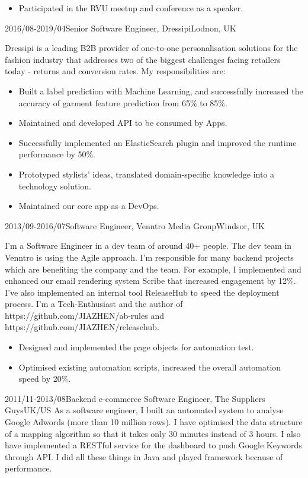 \documentclass[a4paper]{twentysecondcv-english} %
\begin{document}
\begin{twenty}
{\begin{itemize}
                \item Participated in the RVU meetup and conference as a speaker.
                \end{itemize}}
	\twentyitem
	    {2016/08-2019/04}{Senior Software Engineer, Dressipi}{Lodnon, UK}
    	{Dressipi is a leading B2B provider of one-to-one personalisation solutions for the fashion industry that addresses two of the biggest challenges facing retailers today - returns and conversion rates. My responsibilities are:
        	\begin{itemize}
                \item Built a label prediction with Machine Learning, and successfully increased the accuracy of garment feature prediction from 65\% to 85\%.
                \item Maintained and developed API to be consumed by Apps.
                \item Successfully implemented an ElasticSearch plugin and improved the runtime performance by 50\%.
                \item Prototyped stylists' ideas, translated domain-specific knowledge into a technology solution.
                \item Maintained our core app as a DevOps.
            \end{itemize}}
\end{twenty}

\newpage %
\makesidebar

\begin{twenty}
    \twentyitem
	    {2013/09-2016/07}{Software Engineer, Venntro Media Group}{Windsor, UK}
    	{I'm a Software Engineer in a dev team of around 40+ people. The dev team in Venntro is using the Agile approach. I'm responsible for many backend projects which are benefiting the company and the team. For example, I implemented and enhanced our email rendering system Scribe that increased engagement by 12\%. I've also implemented an internal tool ReleaseHub to speed the deployment process. I'm a Tech-Enthusiast and the author of https://github.com/JIAZHEN/ab-rules and https://github.com/JIAZHEN/releasehub.
        	\begin{itemize}
                \item Designed and implemented the page objects for automation test.
                \item Optimised existing automation scripts, increased the overall automation speed by 20\%.
            \end{itemize}}
    \twentyitem
	    {2011/11-2013/08}{Backend e-commerce Software Engineer, The Suppliers Guys}{UK/US}
    	{As a software engineer, I built an automated system to analyse Google Adwords (more than 10 million rows). I have optimised the data structure of a mapping algorithm so that it takes only 30 minutes instead of 3 hours. I also have implemented a RESTful service for the dashboard to push Google Keywords through API. I did all these things in Java and played framework because of performance.}
\end{twenty}
\end{document}
